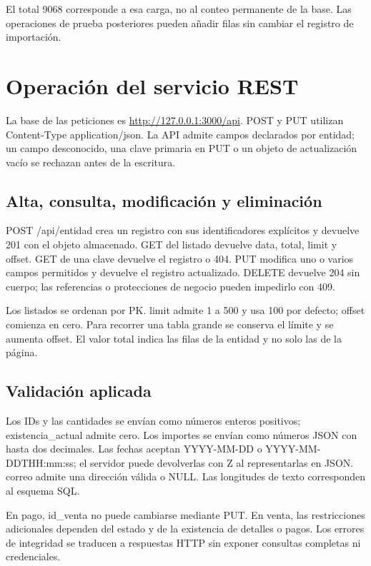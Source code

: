 El total 9068 corresponde a esa carga, no al conteo permanente de la base. Las operaciones de prueba posteriores pueden añadir filas sin cambiar el registro de importación.


\section{Operación del servicio REST}
La base de las peticiones es \url{http://127.0.0.1:3000/api}. POST y PUT utilizan Content-Type application/json. La API admite campos declarados por entidad; un campo desconocido, una clave primaria en PUT o un objeto de actualización vacío se rechazan antes de la escritura.

\subsection{Alta, consulta, modificación y eliminación}
POST /api/entidad crea un registro con sus identificadores explícitos y devuelve 201 con el objeto almacenado. GET del listado devuelve data, total, limit y offset. GET de una clave devuelve el registro o 404. PUT modifica uno o varios campos permitidos y devuelve el registro actualizado. DELETE devuelve 204 sin cuerpo; las referencias o protecciones de negocio pueden impedirlo con 409.

Los listados se ordenan por PK. limit admite 1 a 500 y usa 100 por defecto; offset comienza en cero. Para recorrer una tabla grande se conserva el límite y se aumenta offset. El valor total indica las filas de la entidad y no solo las de la página.


\subsection{Validación aplicada}
Los IDs y las cantidades se envían como números enteros positivos; existencia\_actual admite cero. Los importes se envían como números JSON con hasta dos decimales. Las fechas aceptan YYYY-MM-DD o YYYY-MM-DDTHH:mm:ss; el servidor puede devolverlas con Z al representarlas en JSON. correo admite una dirección válida o NULL. Las longitudes de texto corresponden al esquema SQL.

En pago, id\_venta no puede cambiarse mediante PUT. En venta, las restricciones adicionales dependen del estado y de la existencia de detalles o pagos. Los errores de integridad se traducen a respuestas HTTP sin exponer consultas completas ni credenciales.

